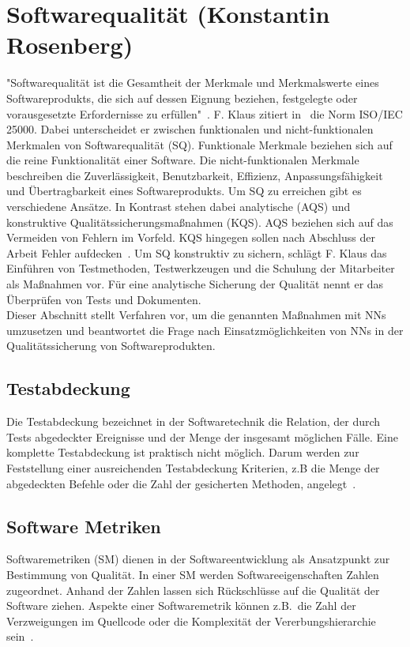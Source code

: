 \section{Softwarequalität (Konstantin Rosenberg)} \label{SQ}
"Softwarequalität ist die Gesamtheit der Merkmale und Merkmalswerte eines Softwareprodukts, die sich auf dessen Eignung beziehen,
festgelegte oder vorausgesetzte
Erfordernisse zu erfüllen"~\cite[p.~20]{Franz2015}.
F. Klaus zitiert in~\cite[p.~20]{Franz2015} die Norm ISO/IEC 25000. Dabei unterscheidet er zwischen funktionalen und nicht-funktionalen Merkmalen von Softwarequalität (SQ).
Funktionale Merkmale beziehen sich auf die reine Funktionalität einer Software. Die nicht-funktionalen Merkmale beschreiben die Zuverlässigkeit, Benutzbar\-keit, Effizienz, Anpassungsfähigkeit und Übertragbarkeit eines Softwareprodukts.
Um SQ zu erreichen gibt es verschiedene Ansätze. In Kontrast stehen dabei analytische (AQS) und konstruktive Qualitätssicherungsmaßnahmen (KQS). AQS beziehen sich auf das Vermeiden von Fehlern im Vorfeld. KQS hingegen sollen nach Abschluss der Arbeit Fehler aufdecken~\cite[p.~29]{Franz2015}. 
Um SQ konstruktiv zu sichern, schlägt F. Klaus das Einführen von Testmethoden, Testwerkzeugen und die Schulung der Mitarbeiter als Maßnahmen vor. Für eine analytische Sicherung der Qualität nennt er das Überprüfen von Tests und Dokumenten.\\
Dieser Abschnitt stellt Verfahren vor, um die genann\-ten Maßnahmen mit NNs umzusetzen und beantwortet die Frage nach Einsatzmöglichkeiten von NNs in der Qualitätssicherung von Softwareprodukten.

\subsection{Testabdeckung}
Die Testabdeckung bezeichnet in der Softwaretechnik die Relation, der durch Tests abgedeckter Ereignisse und der Menge der insgesamt möglichen Fälle. Eine komplette Testabdeckung ist praktisch nicht möglich. Darum werden zur Feststellung einer ausreichenden Testabdeckung Kriterien, z.B die Menge der abgedeckten Befehle oder die Zahl der gesicherten Methoden, angelegt~\cite{Antinyan2018}.

\subsection{Software Metriken}
Softwaremetriken (SM) dienen in der Softwareentwicklung als Ansatzpunkt zur Bestimmung von Qualität. In einer SM werden Softwareeigenschaften Zahlen zugeordnet. Anhand der Zahlen lassen sich Rückschlüsse auf die Qualität der Software ziehen. Aspekte einer Softwaremetrik können z.B.~die Zahl der Verzweigungen im Quellcode oder die Komplexität der Vererbungs\-hierarchie sein~\cite[p.~3]{Committee1998}.

